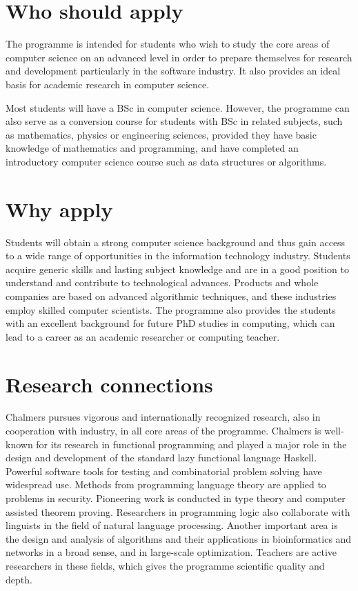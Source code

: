 \documentclass[11pt]{article}
\begin{document}
\section*{Who should apply}

The programme is intended for students who wish to study the core areas of computer science on an advanced level in order to prepare themselves for research and development particularly in the software industry. It also 
provides an ideal basis for academic research in computer science.
 
Most students will have a BSc in computer science. However, the programme can also serve as a conversion course for students with BSc in related subjects, such as mathematics, physics or engineering sciences, provided they have basic knowledge of mathematics and programming, and have completed an introductory computer science course such as data structures or algorithms.

\section*{Why apply}

Students will obtain a strong computer science background and thus gain access 
to a wide range of opportunities in the information technology industry. 
Students acquire generic skills and lasting subject knowledge and are in a 
good position to understand and contribute to technological advances. Products 
and whole companies are based on advanced algorithmic techniques, and these 
industries employ skilled computer scientists. The programme also provides the 
students with an excellent background for future PhD studies in computing, 
which can lead to a career as an academic researcher or computing teacher.

\section*{Research connections}

Chalmers pursues vigorous and internationally recognized research, also in
cooperation with industry, in all core areas of the programme. Chalmers is 
well-known for its research in functional programming and played a major role 
in the design and development of the standard lazy functional language Haskell. Powerful software tools for testing and combinatorial problem solving 
have widespread use. Methods from programming language theory are applied to 
problems in security. Pioneering work is conducted in type theory and computer 
assisted theorem proving. Researchers in programming logic also collaborate 
with linguists in the field of natural language processing. Another important 
area is the design and analysis of algorithms and their applications in 
bioinformatics and networks in a broad sense, and in large-scale optimization. 
Teachers are active researchers in these fields, which gives the programme 
scientific quality and depth.
\end{document}
